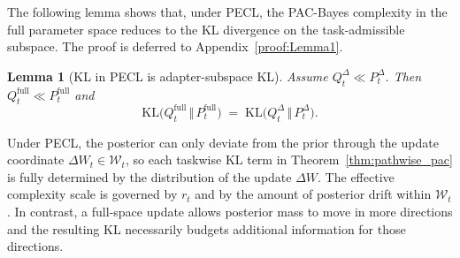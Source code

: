 \documentclass{article}
\theoremstyle{plain}
\newtheorem{lemma}[theorem]{Lemma}
\theoremstyle{definition}
\theoremstyle{remark}
\begin{document}
The following lemma shows that, under PECL, the PAC-Bayes complexity in the full parameter space reduces to the KL divergence on the task-admissible subspace.
The proof is deferred to Appendix~\ref{proof:Lemma1}.
\begin{lemma}[KL in PECL is adapter-subspace KL]
\label{lem:kl-decomp-pecl}
Assume $Q_t^\Delta \ll P_t^\Delta$. Then $Q_t^{\mathrm{full}} \ll P_t^{\mathrm{full}}$ and
$$
\mathrm{KL}\bigl(Q_t^{\mathrm{full}} \,\Vert\, P_t^{\mathrm{full}}\bigr)
\;=\;
\mathrm{KL}\bigl(Q_t^\Delta \,\Vert\, P_t^\Delta\bigr).
$$
\end{lemma}
Under PECL, the posterior can only deviate from the prior through the update coordinate $\Delta W_t\in\mathcal W_t$, so each taskwise KL term in Theorem~\ref{thm:pathwise_pac} is fully determined by the distribution of the update $\Delta W$. The effective complexity scale is governed by $r_t$ and by the amount of posterior drift within $\mathcal W_t$. In contrast, a full-space update allows posterior mass to move in more directions and the resulting KL necessarily budgets additional information for those directions.
\end{document}
